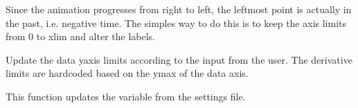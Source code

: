 \documentclass[letterpaper,10pt,english]{sphinxmanual}
\begin{document}
\begin{fulllineitems}
\begin{fulllineitems}
\end{fulllineitems}


\begin{fulllineitems}
\label{\detokenize{animation:animation.CustomFigCanvas.generate_xticklabels}}
Since the animation progresses from right to left, the left\sphinxhyphen{}most point is actually in the past,
i.e. negative time. The simples way to do this is to keep the axis limits from 0 to xlim and alter the labels.

\end{fulllineitems}


\begin{fulllineitems}
\label{\detokenize{animation:animation.CustomFigCanvas.update_ylim}}
Update the data y\sphinxhyphen{}axis limits according to the input from the user.
The derivative limits are hard\sphinxhyphen{}coded based on the ymax of the data axis.

\end{fulllineitems}


\begin{fulllineitems}
\label{\detokenize{animation:animation.CustomFigCanvas.update_window}}
This function updates the  variable from the settings file.

\end{fulllineitems}


\end{fulllineitems}
\end{document}
